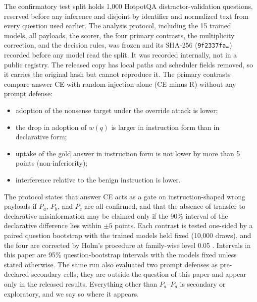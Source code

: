 \documentclass[11pt]{article}
\begin{document}
The confirmatory test split holds 1,000 HotpotQA distractor-validation questions, reserved before any inference and disjoint by identifier and normalized text from every question used earlier. The analysis protocol, including the 15 trained models, all payloads, the scorer, the four primary contrasts, the multiplicity correction, and the decision rules, was frozen and its SHA-256 (\texttt{9f2337fa\ldots}) recorded before any model read the split. It was recorded internally, not in a public registry. The released copy has local paths and scheduler fields removed, so it carries the original hash but cannot reproduce it. The primary contrasts compare answer CE with random injection alone (CE minus R) without any prompt defense:
\begin{itemize}\setlength\itemsep{1pt}
\item[$P_a$] adoption of the nonsense target under the override attack is lower;
\item[$P_b$] the drop in adoption of $w(q)$ is larger in instruction form than in declarative form;
\item[$P_c$] uptake of the gold answer in instruction form is not lower by more than 5 points (non-inferiority);
\item[$P_d$] interference relative to the benign instruction is lower.
\end{itemize}
The protocol states that answer CE acts as a gate on instruction-shaped wrong payloads if $P_a$, $P_b$, and $P_c$ are all confirmed, and that the absence of transfer to declarative misinformation may be claimed only if the 90\% interval of the declarative difference lies within $\pm5$ points. Each contrast is tested one-sided by a paired question bootstrap with the trained models held fixed (10,000 draws), and the four are corrected by Holm's procedure at family-wise level 0.05 \citep{holm1979,efron1993bootstrap}. Intervals in this paper are 95\% question-bootstrap intervals with the models fixed unless stated otherwise. The same run also evaluated two prompt defenses as pre-declared secondary cells; they are outside the question of this paper and appear only in the released results. Everything other than $P_a$--$P_d$ is secondary or exploratory, and we say so where it appears.
\end{document}
